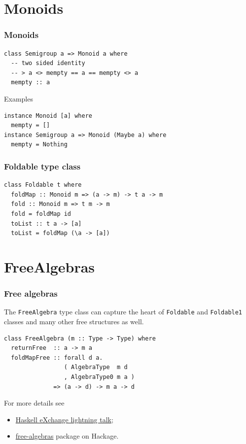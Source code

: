 \documentclass[t,dvipsnames,hyperref={colorlinks,citecolor=NavyBlue,linkcolor=NavyBlue,anchorcolor=NavyBlue,urlcolor=NavyBlue}]{beamer}
\begin{document}
\section{Monoids}

\begin{frame}[fragile]
  \frametitle{Monoids}
  \begin{verbatim}
class Semigroup a => Monoid a where
  -- two sided identity
  -- > a <> mempty == a == mempty <> a
  mempty :: a
  \end{verbatim}

  Examples
  \begin{verbatim}
instance Monoid [a] where
  mempty = []
instance Semigroup a => Monoid (Maybe a) where
  mempty = Nothing
  \end{verbatim}
\end{frame}

\begin{frame}[fragile]
  \frametitle{Foldable type class}
  \begin{verbatim}
class Foldable t where
  foldMap :: Monoid m => (a -> m) -> t a -> m
  fold :: Monoid m => t m -> m
  fold = foldMap id
  toList :: t a -> [a]
  toList = foldMap (\a -> [a]) 
  \end{verbatim}
\end{frame}

\section{FreeAlgebras}

\begin{frame}[fragile]
  \frametitle{Free algebras}
  {\small
    The \texttt{FreeAlgebra} type class can capture the heart of \texttt{Foldable} and
    \texttt{Foldable1} classes and many other free structures as well.
  }
  \begin{verbatim}
class FreeAlgebra (m :: Type -> Type) where
  returnFree  :: a -> m a
  foldMapFree :: forall d a.
                 ( AlgebraType  m d
                 , AlgebraType0 m a )
              => (a -> d) -> m a -> d
  \end{verbatim}
  {\small
  For more details see
  \begin{itemize}
    \item \href{https://skillsmatter.com/skillscasts/13007-lightning-talk-rethinking-freeness-through-universal-algebra}{Haskell eXchange lightning talk};
    \item \href{https://hackage.haskell.org/package/free-algebras}{free-algebras}
      package on Hackage.
  \end{itemize}
  }
\end{frame}
\end{document}
